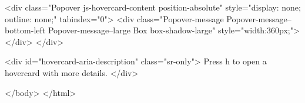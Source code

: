   <div class="Popover js-hovercard-content position-absolute" style="display: none; outline: none;" tabindex="0">
  <div class="Popover-message Popover-message--bottom-left Popover-message--large Box box-shadow-large" style="width:360px;">
  </div>
</div>

<div id="hovercard-aria-description" class="sr-only">
  Press h to open a hovercard with more details.
</div>


  </body>
</html>

